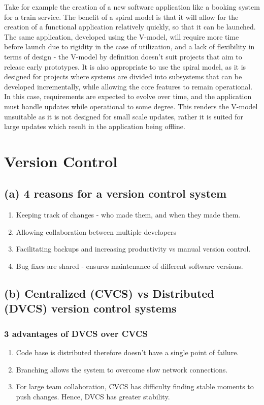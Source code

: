 \documentclass{article}
\begin{document}
\begin{flushleft}
\begin{itemize}
\end{itemize}
	Take for example the creation of a new software application like a booking system for a train service. The benefit of a spiral model is that it will allow for the creation of a functional application relatively quickly, so that it can be launched. The same application, developed using the V-model, will require more time before launch due to rigidity in the case of utilization, and a lack of flexibility in terms of design - the V-model by definition doesn't suit projects that aim to release early prototypes.
\newline
\newline
	It is also appropriate to use the spiral model, as it is designed for projects where systems are divided into subsystems that can be developed incrementally, while allowing the core features to remain operational. In this case, requirements are expected to evolve over time, and the application must handle updates while operational to some degree. This renders the V-model unsuitable as it is not designed for small scale updates, rather it is suited for large updates which result in the application being offline.
\end{flushleft}
\newpage
\section{Version Control}
\subsection{(a) 4 reasons for a version control system}
\begin{enumerate}
	\item Keeping track of changes - who made them, and when they made them.
	\item Allowing collaboration between multiple developers
	\item Facilitating backups and increasing productivity vs manual version control.
	\item Bug fixes are shared - ensures maintenance of different software versions.
\end{enumerate}
\subsection{(b) Centralized (CVCS) vs Distributed (DVCS) version control systems}
\subsubsection{3 advantages of DVCS over CVCS}
\begin{enumerate}
	\item Code base is distributed therefore doesn't have a single point of failure.
	\item Branching allows the system to overcome slow network connections.
	\item For large team collaboration, CVCS has difficulty finding stable moments to push changes. Hence, DVCS has greater stability.
\end{enumerate}
\end{document}
